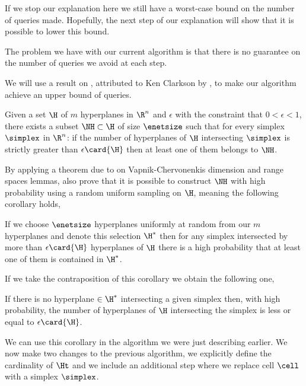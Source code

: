 
If we stop our explanation here we still have a worst-case 
bound on the number of queries made. Hopefully, the next step of our
explanation will show that it is possible to lower this bound.

The problem we have with our current algorithm is that there is no guarantee
on the number of queries we avoid at each step.

We will use a result on \enets, attributed to Ken Clarkson by
\citet{burgisser:1997}, to make our algorithm achieve an upper bound
of  queries.

\begin{theorem}[Clarkson]
Given a set $\H$ of $m$ hyperplanes in $\R^n$ and $\epsilon$ with the
constraint that $0 < \epsilon < 1$, there exists a subset $\NH \subset \H$ of
size $\enetsize$ such that for every simplex $\simplex$ in $\R^n$: if the
number of hyperplanes of $\H$ intersecting $\simplex$ is strictly greater than
$\epsilon \card{\H}$ then at least one of them belongs to $\NH$.
\end{theorem}

By applying a theorem due to \citet*{haussler:1987} on Vapnik-Chervonenkis
dimension and range spaces lemmas, \citet{burgisser:1997} also prove that it is possible to
construct $\NH$ with high probability using a random uniform sampling on $\H$,
meaning the following corollary holds,

\begin{corollary}
If we choose $\enetsize$ hyperplanes uniformly at
random from our $m$ hyperplanes and denote this selection $\H^{*}$ then for
any simplex intersected by more than $\epsilon \card{\H}$ hyperplanes of $\H$
there is a high probability that at least one of them is contained in $\H^{*}$.
\end{corollary}

If we take the contraposition of this corollary we obtain the following one,

\begin{corollary}
If there is no hyperplane $\in \H^{*}$ intersecting a given simplex then, with
high probability, the number of hyperplanes of $\H$ intersecting the simplex
is less or equal to $\epsilon \card{\H}$.
\end{corollary}

We can use this corollary in the algorithm we were just describing earlier. We
now make two changes to the previous algorithm, we explicitly define the
cardinality of $\Ht$ and we include an additional step where we replace cell
$\cell$ with a simplex $\simplex$.

